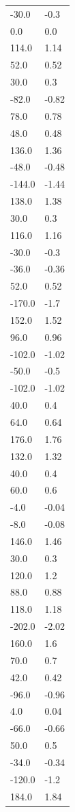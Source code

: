 \begin{longtable}{ll}
-30.0 & -0.3 \\
0.0 & 0.0 \\
114.0 & 1.14 \\
52.0 & 0.52 \\
30.0 & 0.3 \\
-82.0 & -0.82 \\
78.0 & 0.78 \\
48.0 & 0.48 \\
136.0 & 1.36 \\
-48.0 & -0.48 \\
-144.0 & -1.44 \\
138.0 & 1.38 \\
30.0 & 0.3 \\
116.0 & 1.16 \\
-30.0 & -0.3 \\
-36.0 & -0.36 \\
52.0 & 0.52 \\
-170.0 & -1.7 \\
152.0 & 1.52 \\
96.0 & 0.96 \\
-102.0 & -1.02 \\
-50.0 & -0.5 \\
-102.0 & -1.02 \\
40.0 & 0.4 \\
64.0 & 0.64 \\
176.0 & 1.76 \\
132.0 & 1.32 \\
40.0 & 0.4 \\
60.0 & 0.6 \\
-4.0 & -0.04 \\
-8.0 & -0.08 \\
146.0 & 1.46 \\
30.0 & 0.3 \\
120.0 & 1.2 \\
88.0 & 0.88 \\
118.0 & 1.18 \\
-202.0 & -2.02 \\
160.0 & 1.6 \\
70.0 & 0.7 \\
42.0 & 0.42 \\
-96.0 & -0.96 \\
4.0 & 0.04 \\
-66.0 & -0.66 \\
50.0 & 0.5 \\
-34.0 & -0.34 \\
-120.0 & -1.2 \\
184.0 & 1.84 \\

\end{longtable}
